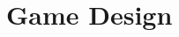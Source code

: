 \documentclass[../Main.tex]{subfiles}
\begin{document}
\section{Game Design}
\label{chap:Game_Design}

\biblio %
\end{document}
